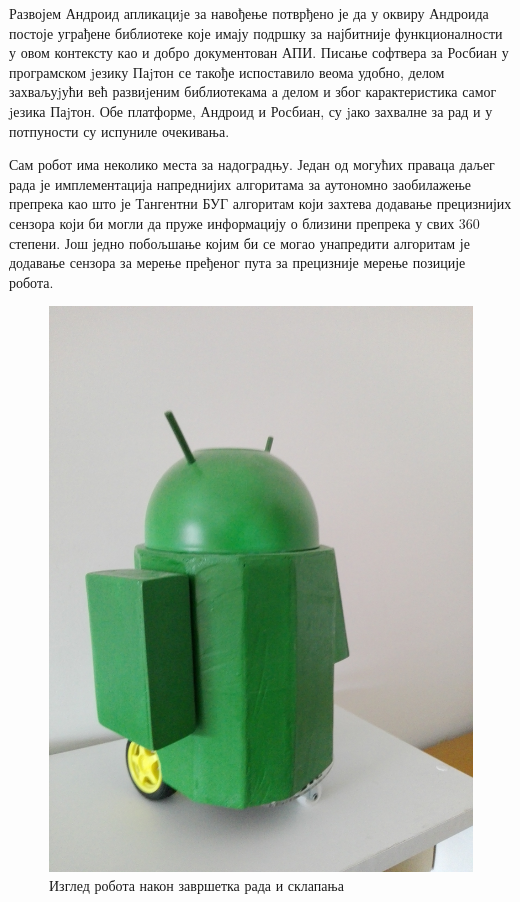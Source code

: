 \documentclass[12pt,oneside]{memoir}
\theoremstyle{remark}
\begin{document}
Развојем Андроид апликациjе за навођење потврђено је да у оквиру Андроида постоје уграђене библиотеке које имају подршку за најбитније функционалности у овом контексту као и добро документован АПИ. Писање софтвера за Росбиан у програмском jезику Паjтон се такође испоставило веома удобно, делом захваљуjући већ развиjеним библиотекама а делом и због карактеристика самог jезика Паjтон. Обе платформе, Андроид и Росбиан, су jако захвалне за рад и у потпуности су испуниле очекивања.

Сам робот има неколико места за надоградњу. Један од могућих праваца даљег рада је имплементација напреднијих алгоритама за аутономно заобилажење препрека као што је Тангентни БУГ алгоритам који захтева додавање прецизнијих сензора који би могли да пруже информацију о близини препрека у свих 360 степени. Још једно побољшање којим би се могао унапредити алгоритам је додавање сензора за мерење пређеног пута за прецизније мерење позиције робота.  

\begin{figure}[!ht]
\centering
\includegraphics[width=1.0\textwidth]{slike/final.jpg}
\caption{Изглед робота након завршетка рада и склапања}
\label{fig:finalrobot}
\end{figure}
\end{document}
